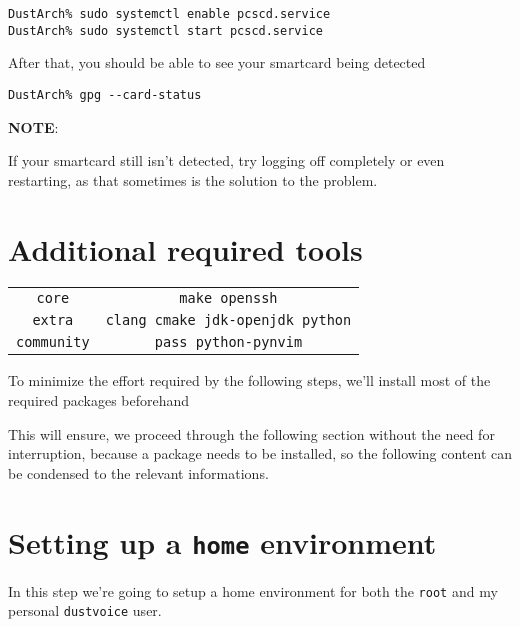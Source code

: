 \documentclass[9pt]{report}
\newcommand{\admonition}[2]{\textbf{#1}: {#2}}
\begin{document}
\begin{verbatim}
DustArch% sudo systemctl enable pcscd.service
DustArch% sudo systemctl start pcscd.service
\end{verbatim}

After that, you should be able to see your smartcard being detected


\begin{verbatim}
DustArch% gpg --card-status
\end{verbatim}

\admonition{NOTE}{If your smartcard still isn’t detected, try logging off completely or even restarting, as that sometimes is the solution to the problem.

}

\vfill\eject

\hypertarget{x-additional-required-tools}{\section{Additional required tools}}
\begin{center}
\begin{tabular}{|c|c|}
\hline
\texttt{core} & \texttt{make openssh} \\ 
\texttt{extra} & \texttt{clang cmake jdk-openjdk python} \\ 
\texttt{community} & \texttt{pass python-pynvim} \\ 
\hline
\end{tabular}
\end{center}

To minimize the effort required by the following steps, we’ll install most of the required packages beforehand


This will ensure, we proceed through the following section without the need for interruption, because a package needs to be installed, so the following content can be condensed to the relevant informations.



\vfill\eject

\hypertarget{x-setting-up-a-home-environment}{\section{Setting up a \texttt{home} environment}}
In this step we’re going to setup a home environment for both the \texttt{root} and my personal \texttt{dustvoice} user.
\end{document}
